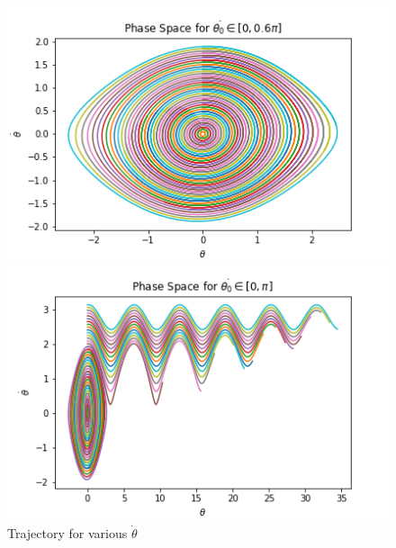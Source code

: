 \begin{problem}{1}
\begin{figure}[ht!]
	\centering
	\begin{minipage}[b]{0.4\textwidth}
		\includegraphics[scale=0.6]{../figures/phaseSpaceDot.png}
	\end{minipage}
	\hfill
	\begin{minipage}[b]{0.4\textwidth}
		\includegraphics[scale=0.6]{../figures/phaseSpaceDot2.png}
	\end{minipage}
	\caption{Trajectory for various $\dot{\theta}$}
	\label{phaseDot}
\end{figure}
\end{problem}

